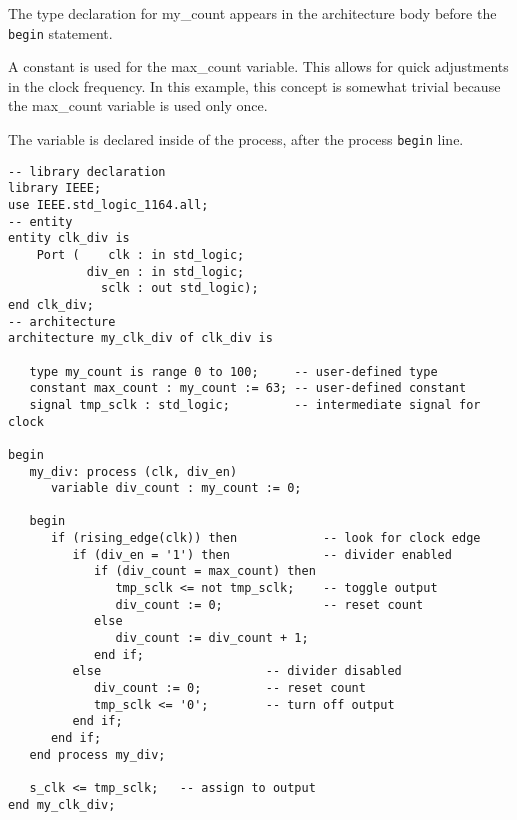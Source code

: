 \begin{my_list}
\item The type declaration for my\_count appears in the architecture body before the \texttt{begin} statement. 

\item A constant is used for the max\_count variable. This allows for quick adjustments in the clock frequency. In this example, this concept is somewhat trivial because the max\_count variable is used only once.  

\item The variable is declared inside of the process, after the process \texttt{begin} line.
\end{my_list}

\begin{minipage}{0.99\linewidth}
\begin{lstlisting}[label=ex26_code, caption=Solution to Example 26.]
-- library declaration
library IEEE;
use IEEE.std_logic_1164.all;
-- entity
entity clk_div is
    Port (    clk : in std_logic;
           div_en : in std_logic;
             sclk : out std_logic);
end clk_div;
-- architecture
architecture my_clk_div of clk_div is

   type my_count is range 0 to 100;     -- user-defined type
   constant max_count : my_count := 63; -- user-defined constant
   signal tmp_sclk : std_logic;         -- intermediate signal for clock
   
begin
   my_div: process (clk, div_en)   
      variable div_count : my_count := 0; 

   begin
      if (rising_edge(clk)) then            -- look for clock edge
         if (div_en = '1') then             -- divider enabled
            if (div_count = max_count) then 
               tmp_sclk <= not tmp_sclk;    -- toggle output
               div_count := 0;              -- reset count
            else
               div_count := div_count + 1; 
            end if; 
         else                       -- divider disabled
            div_count := 0;         -- reset count 
            tmp_sclk <= '0';        -- turn off output
         end if; 
      end if; 
   end process my_div; 

   s_clk <= tmp_sclk;   -- assign to output
end my_clk_div;
\end{lstlisting}
\end{minipage}

